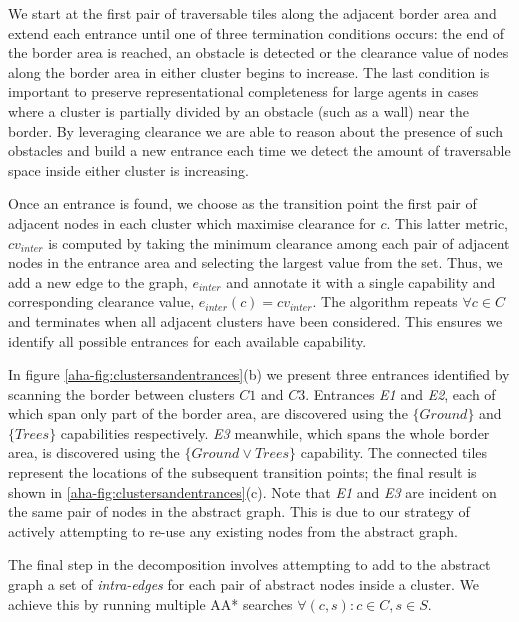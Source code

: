 {\begin{figure}[htbp]
\end{figure}
\par \indent
We start at the first pair of traversable tiles along the adjacent border area and extend each entrance until one of three termination conditions occurs: the end of the border area is reached, an obstacle is detected or the clearance value of nodes along the border area in either cluster begins to increase. 
The last condition is important to preserve representational completeness for large agents in cases where a cluster is partially divided by an obstacle (such as a wall) near the border.
By leveraging clearance we are able to reason about the presence of such obstacles and build a new entrance each time we detect the amount of traversable space inside either cluster is increasing.
\par \indent
Once an entrance is found, we choose as the transition point the first pair of adjacent nodes in each cluster which maximise clearance for $c$.
This latter metric, $cv_{inter}$ is computed by taking the minimum clearance among each pair of adjacent nodes in the entrance area and selecting the largest value from the set. 
Thus, we add a new edge to the graph, $e_{inter}$ and annotate it with a single capability and corresponding clearance value, $e_{inter}(c) = cv_{inter}$. 
The algorithm repeats $\forall c \in C$ and terminates when all adjacent clusters have been considered. 
This ensures we identify all possible entrances for each available capability.
\par \indent
In figure \ref{aha-fig:clustersandentrances}(b) we present three entrances identified by scanning the border between clusters $C1$ and $C3$.
Entrances \emph{E1} and \emph{E2}, each of which span only part of the border area, are discovered using the $\lbrace Ground \rbrace$ and $\lbrace Trees \rbrace$ capabilities respectively. 
\emph{E3} meanwhile, which spans the whole border area, is discovered using the $\lbrace Ground \vee Trees \rbrace$ capability. 
The connected tiles represent the locations of the subsequent transition points; the final result is shown in \ref{aha-fig:clustersandentrances}(c). 
Note that \emph{E1} and \emph{E3} are incident on the same pair of nodes in the abstract graph. This is due to our  strategy of actively attempting to re-use any existing nodes from the abstract graph. 
\par \indent
The final step in the decomposition involves attempting to add to the abstract graph a set of \emph{intra-edges} for each pair of abstract nodes inside a cluster. 
We achieve this by running multiple AA* searches $\forall (c, s) : c \in C, s \in S$.
}
